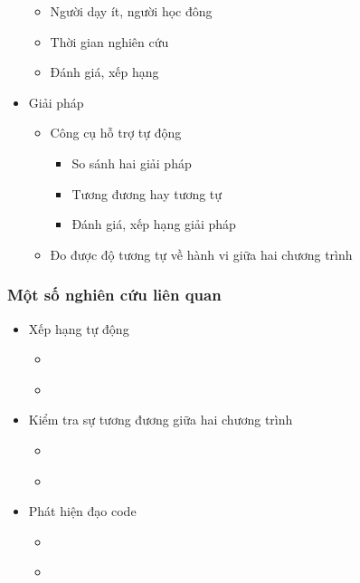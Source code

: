 \documentclass{beamer}
\begin{document}
\begin{frame}
\begin{minipage}{0.59\linewidth}
\begin{itemize}
      \begin{itemize}
      \item Người dạy ít, người học đông
      \item Thời gian nghiên cứu
      \item Đánh giá, xếp hạng      
      \end{itemize}
    \item Giải pháp
      \begin{itemize}
      \item Công cụ hỗ trợ tự động
      	\begin{itemize}
      	\item So sánh hai giải pháp
      	\item Tương đương hay tương tự
      	\item Đánh giá, xếp hạng giải pháp
    	\end{itemize}
      \item Đo được độ tương tự về hành vi giữa hai chương trình
      \end{itemize}
  \end{itemize}

  \end{minipage}
\end{frame}

\begin{frame}
  \frametitle{Một số nghiên cứu liên quan}
  \begin{itemize}
  	\item Xếp hạng tự động
  		\begin{itemize}
  			\item \cite{alur2013automated}
  			\item \cite{singh2013automated}  			
  		\end{itemize}
  	\item Kiểm tra sự tương đương giữa hai chương trình
	  	\begin{itemize}
	  		\item \cite{jackson1994semantic}
	  		\item \cite{jiang2009automatic}
	  	\end{itemize}
  	\item Phát hiện đạo code
  		\begin{itemize}
  			\item \cite{baxter1998clone}
  			\item \cite{komondoor2001using}
  		\end{itemize}
  \end{itemize}

\end{frame}
\end{document}
